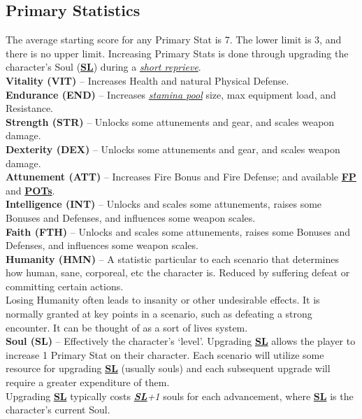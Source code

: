 \documentclass[12pt]{article}
\newcommand{\refto}[1]{\hyperlink{#1}{\textbf{#1}}}
\newcommand{\makeref}[1]{\hypertarget{#1}{\textbf{#1}}}
\newcommand{\reftoit}[1]{\hyperlink{#1}{\emph{#1}}}
\begin{document}
\begin{multicols*}{2}
\subsection{Primary Statistics}
The average starting score for any Primary Stat is 7. The lower limit is 3, and there is no upper limit. Increasing Primary Stats is done through upgrading the character’s Soul (\refto{SL}) during a \reftoit{short reprieve}.\\

\textbf{Vitality (\makeref{VIT})} – Increases Health and natural Physical Defense.\\
\textbf{Endurance (\makeref{END})} – Increases \reftoit{stamina pool} size, max equipment load, and Resistance.\\
\textbf{Strength (\makeref{STR})} – Unlocks some attunements and gear, and scales weapon damage.\\
\textbf{Dexterity (\makeref{DEX})} – Unlocks some attunements and gear, and scales weapon damage.\\
\textbf{Attunement (\makeref{ATT})} – Increases Fire Bonus and Fire Defense; and available \refto{FP} and \refto{POTs}.\\
\textbf{Intelligence (\makeref{INT})} – Unlocks and scales some attunements, raises some Bonuses and Defenses, and influences some weapon scales.\\
\textbf{Faith (\makeref{FTH})} – Unlocks and scales some attunements, raises some Bonuses and Defenses, and influences some weapon scales.\\
\textbf{Humanity (\makeref{HMN})} – A statistic particular to each scenario that determines how human, sane, corporeal, etc the character is. Reduced by suffering defeat or committing certain actions.\\ Losing Humanity often leads to insanity or other undesirable effects. It is normally granted at key points in a scenario, such as defeating a strong encounter. It can be thought of as a sort of lives system.\\
\textbf{Soul (\makeref{SL})} – Effectively the character’s ‘level’. Upgrading \refto{SL} allows the player to increase 1 Primary Stat on their character. Each scenario will utilize some resource for upgrading \refto{SL} (usually souls) and each subsequent upgrade will require a greater expenditure of them.\\
Upgrading \refto{SL} typically costs \emph{\refto{SL}+1} souls for each advancement, where \refto{SL} is the character’s current Soul.


\end{multicols*}
\end{document}
